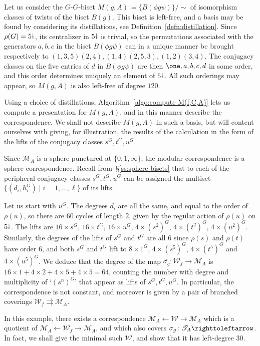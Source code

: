 \documentclass{amsart}
\begin{document}
Let us consider the $G$-$G$-biset $M(g,A)\coloneqq\{B(\phi
g\psi)\}/{\sim}$ of isomorphism classes of twists of the biset
$B(g)$. This biset is left-free, and a basis may be found by
considering its distillations, see
Definition~\ref{defn:distillation}. Since $\rho(G)=5{\stackrel{\downarrow}{\smash.}}$, its
centralizer in $5{\stackrel{\downarrow}{\smash.}}$ is trivial, so the permutations associated
with the generators $a,b,c$ in the biset $B(\phi g\psi)$ can in a
unique manner be brought respectively to
$(1,3,5)(2,4),(1,4)(2,5,3),(1,2)(3,4)$. The conjugacy classes on the
five entries of $d$ in $B(\phi g\psi)$ are then $\one,a,b,c,d$ in some
order, and this order determines uniquely an element of $5{\stackrel{\downarrow}{\smash.}}$. All
such orderings may appear, so $M(g,A)$ is also left-free of degree
$120$.

Using a choice of distillations, Algorithm~\ref{algo:compute M(f,C,A)}
lets us compute a presentation for $M(g,A)$, and in this manner
describe the correspondence. We shall not describe $M(g,A)$ in such a
basis, but will content ourselves with giving, for illustration, the
results of the calculation in the form of the lifts of the conjugacy
classes $s^G,t^G,u^G$.

Since $\mathscr M_A$ is a sphere punctured at $\{0,1,\infty\}$, the
modular correspondence is a sphere correspondence. Recall
from~\S\ref{ss:sphere bisets} that to each of the peripheral conjugacy
classes $s^G,t^G,u^G$ can be assigned the multiset $\{(d_i,h_i^G)\mid
i=1,\dots,\ell\}$ of its lifts.

Let us start with $u^G$. The degrees $d_i$ are all the same, and equal
to the order of $\rho(u)$, so there are $60$ cycles of length $2$,
given by the regular action of $\rho(u)$ on $5{\stackrel{\downarrow}{\smash.}}$. The lifts are
$16\times s^G$, $16\times t^G$, $16\times u^G$, $4\times (s^2)^G$,
$4\times (t^2)^G$, $4\times (u^2)^G$. Similarly, the degrees of the
lifts of $s^G$ and $t^G$ are all $6$ since $\rho(s)$ and $\rho(t)$
have order $6$, and both $s^G$ and $t^G$ lift to $8\times 1^G$,
$4\times (s^5)^G$, $4\times(t^5)^G$ and $4\times (u^5)^G$. We deduce
that the degree of the map $\overline{\sigma_g}\colon\mathscr
W_f\to\mathscr M_A$ is $16\times1+4\times2+4\times5+4\times5=64$,
counting the number with degree and multiplicity of `$(s^n)^G$' that
appear as lifts of $s^G,t^G,u^G$. In particular, the correspondence is
not constant, and moreover is given by a pair of branched coverings
$\mathscr W_f\rightrightarrows\mathscr M_A$.

In this example, there exists a correspondence $\mathscr
M_A\leftarrow\mathscr W\rightarrow\mathscr M_A$ which is a quotient of
$\mathscr M_A\leftarrow\mathscr W_f\rightarrow\mathscr M_A$, and which
also covers $\sigma_g\colon\mathscr T_A\selfmap$. In fact, we shall
give the minimal such $\mathscr W$, and show that it has left-degree
$30$.
\end{document}
